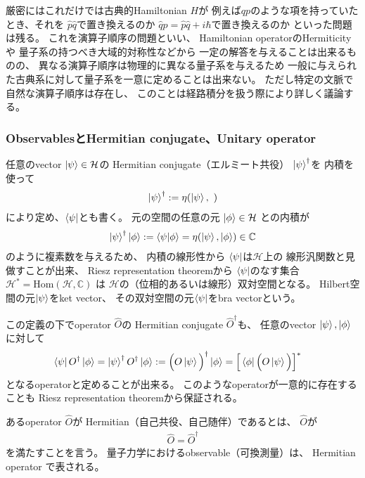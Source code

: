 厳密にはこれだけでは古典的Hamiltonian $H$が
例えば$qp$のような項を持っていたとき、それを
$\hat{p}\hat{q}$で置き換えるのか
$\hat{q}\hat{p} = \hat{p}\hat{q} + i\hbar$で置き換えるのか
といった問題は残る。
これを演算子順序の問題といい、
Hamiltonian operatorのHermiticityや
量子系の持つべき大域的対称性などから
一定の解答を与えることは出来るものの、
異なる演算子順序は物理的に異なる量子系を与えるため
一般に与えられた古典系に対して量子系を一意に定めることは出来ない。
ただし特定の文脈で自然な演算子順序は存在し、
このことは経路積分を扱う際により詳しく議論する。

\subsubsection{ObservablesとHermitian conjugate、Unitary operator}

任意のvector $\ket{\psi} \in \mathcal{H}$の
Hermitian conjugate（エルミート共役） $\ket{\psi}^\dagger$を
内積を使って
\begin{align}
    \ket{\psi}^\dagger
    :=
    \eta(\ket{\psi},\ )
\label{bra vector}
\end{align}
により定め、$\bra{\psi}$とも書く。
元の空間の任意の元
$\ket{\phi} \in \mathcal{H}$
との内積が
\begin{align}
    \ket{\psi}^\dagger \ket{\phi}
    :=
    \braket{\psi|\phi}
    = \eta(\ket{\psi}, \ket{\phi})
    \in \mathbb{C}
\end{align}
のように複素数を与えるため、
内積の線形性から
$\bra{\psi}$は$\mathcal{H}$上の
線形汎関数と見做すことが出来、
Riesz representation theoremから
$\bra{\psi}$のなす集合
$\mathcal{H}^* = \mathrm{Hom} (\mathcal{H}, \mathbb{C})$
は
$\mathcal{H}$の（位相的あるいは線形）双対空間となる。
Hilbert空間の元$\ket{\psi}$をket vector、
その双対空間の元$\bra{\psi}$をbra vectorという。

この定義の下でoperator $\hat{O}$の
Hermitian conjugate $\hat{O}^\dagger$も、
任意のvector $\ket{\psi}, \ket{\phi}$に対して
\begin{align}
    \bra{\psi}
    O^\dagger
    \ket{\phi}
    =
    \ket{\psi}^\dagger
    O^\dagger
    \ket{\phi}
    &:=
    \Big( O \ket{\psi} \Big)^\dagger
    \ket{\phi}
    =
    \Big[
        \bra{\phi} \Big( O \ket{\psi} \Big)
    \Big]^*
\end{align}
となるoperatorと定めることが出来る。
このようなoperatorが一意的に存在することも
Riesz representation theoremから保証される。

あるoperator $\hat{O}$が
Hermitian（自己共役、自己随伴）であるとは、
$\hat{O}$が
\begin{align}
    \hat{O} = \hat{O}^\dagger
\end{align}
を満たすことを言う。
量子力学におけるobservable（可換測量）は、
Hermitian operator で表される。


